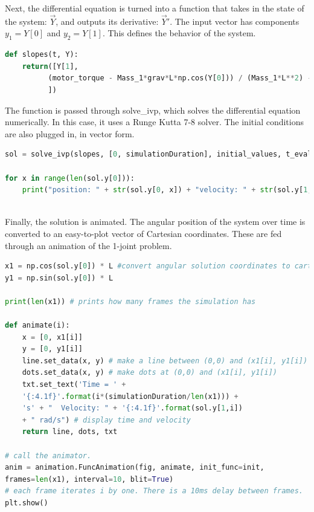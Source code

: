 \documentclass{article}
\begin{document}
\vspace{24pt}

\noindent \justifying Next, the differential equation is turned into a function that takes in the state of the system: $\vec{Y}$, and outputs its derivative: $\vec{Y}'$. The input vector has components $y_1 = Y[0]$ and $y_2 = Y[1]$. This defines the behavior of the system. 
\vspace{24pt}

\begin{lstlisting}[language=Python]
def slopes(t, Y): 
    return([Y[1],        
          (motor_torque - Mass_1*grav*L*np.cos(Y[0])) / (Mass_1*L**2) - B*Y[1]
          ])
\end{lstlisting}

\vspace{24pt}
\noindent \justifying The function is passed through solve\_ivp, which solves the differential equation numerically. In this case, it uses a Runge Kutta 7-8 solver. The initial conditions are also plugged in, in vector form.
\vspace{24pt}

\begin{lstlisting}[language=Python]
sol = solve_ivp(slopes, [0, simulationDuration], initial_values, t_eval=T, method = 'DOP853', rtol=1e-8, atol=1e-8)

for x in range(len(sol.y[0])):
    print("position: " + str(sol.y[0, x]) + "velocity: " + str(sol.y[1, x]))
    
\end{lstlisting}

\vspace{24pt}
\newpage 

\noindent \justifying Finally, the solution is animated. The angular position of the system over time is converted to an easy-to-plot vector of Cartesian coordinates. These are fed through an animation of the 1-joint problem. 
\vspace{24pt}

\begin{lstlisting}[language=Python]
x1 = np.cos(sol.y[0]) * L #convert angular solution coordinates to cartesian for animating
y1 = np.sin(sol.y[0]) * L 

print(len(x1)) # prints how many frames the simulation has

def animate(i):
    x = [0, x1[i]]  
    y = [0, y1[i]]
    line.set_data(x, y) # make a line between (0,0) and (x1[i], y1[i])
    dots.set_data(x, y) # make dots at (0,0) and (x1[i], y1[i])
    txt.set_text('Time = ' +
    '{:4.1f}'.format(i*(simulationDuration/len(x1))) +
    's' + "  Velocity: " + '{:4.1f}'.format(sol.y[1,i])
    + " rad/s") # display time and velocity 
    return line, dots, txt

# call the animator.
anim = animation.FuncAnimation(fig, animate, init_func=init, 
frames=len(x1), interval=10, blit=True)  
# each frame iterates i by one. There is a 10ms delay between frames.
plt.show()
\end{lstlisting}
\end{document}
